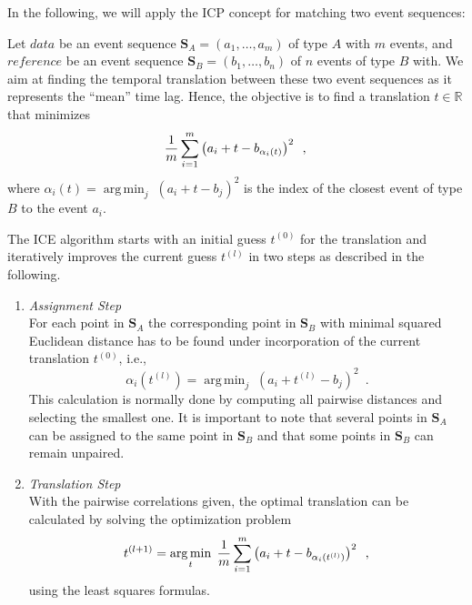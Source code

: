 \documentclass[conference]{IEEEtran}
\theoremstyle{examplestyle}
\DeclareMathOperator*{\argmin}{arg\,min}
\begin{document}
In the following, we will apply the \ac{ICP} concept for matching two event sequences:

Let \(data\) be  an event sequence \(\pmb{S}_A = (a_1,\ldots, a_m)\)   of type \(A\) with \(m\) events,  and \(reference\) be an event sequence \(\pmb{S}_B=(b_1,\ldots, b_n)\)  of \(  n\) events of type \(B\) with. 
We aim at finding the temporal translation between these two event sequences as it represents the ``mean'' time lag.
Hence, the objective is to find a translation $t \in \mathbb{R}$ that minimizes 
\begin{equation}
 \dfrac{1}{m} \sum_{i = 1}^{m} \left( a_i + t - b_{\alpha_i(t)} \right)^2 \enspace , \\
\end{equation}
where $\alpha_i(t)= \argmin_j \; (a_i+t-b_j)^2$ is the index of the closest event of type  $B$  to the event $a_i$.

The \ac{ICE} algorithm starts with an initial guess $t^{(0)}$ for the translation and iteratively improves the current guess $t^{(l)}$  in two steps as described in the following.

\begin{enumerate}
 \item \emph{Assignment Step}\\
For each point in \(\pmb{S}_A\) the corresponding point in \(\pmb{S}_B\) with minimal squared Euclidean distance has to be found under incorporation of the current translation $t^{(0)}$, i.e., 
\begin{equation}
\alpha_i(t^{(l)})= \argmin_j \;  (a_i+t^{(l)}-b_j)^2  \enspace .
\end{equation}
This calculation is normally done by computing all pairwise distances and selecting the smallest one. It is important to note that several points in \(\pmb{S}_A\) can be assigned to the same point in \(\pmb{S}_B\) and that some points in \(\pmb{S}_B\) can remain unpaired.  



\item  \emph{Translation  Step}\\
With the pairwise correlations given, the optimal translation can be calculated by solving  the optimization problem
\begin{equation}
t^{(l+1)}= \argmin_{t} \;  \dfrac{1}{m} \sum_{i = 1}^{m} \left( a_i + t - b_{\alpha_i(t^{(l)})} \right)^2 \enspace , \\
\end{equation}
using the  least squares formulas.
 
\end{enumerate}
\end{document}
